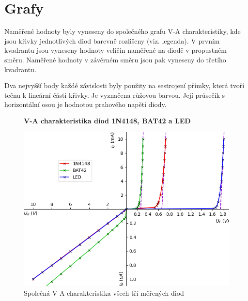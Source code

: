 \documentclass[a4paper, czech]{article}
\begin{document}
\begin{table}[H]
  \caption{Naměřené hodnoty V-A charakteristiky LED v \underline{závěrném} směru}
  \label{tab:6}
\end{table}

\section[short]{Grafy}

Naměřené hodnoty byly vyneseny do společného grafu V-A charakteristiky, kde jsou křivky jednotlivých diod barevně rozlišeny (viz. legenda).
V prvním kvadrantu jsou vyneseny hodnoty veličin naměřené na diodě v propustném směru.
Naměřené hodnoty v závěrném směru jsou pak vyneseny do třetího kvadrantu.

Dva nejvyšší body každé závislosti byly použity na sestrojení přímky, která tvoří tečnu k lineární části křivky.
Je vyznačena růžovou barvou. Její průsečík s horizontální osou je hodnotou prahového napětí diody.

\begin{figure}[H]
  \centering
  \textbf{V-A charakteristika diod 1N4148, BAT42 a LED}\par\medskip
  \includegraphics{va_charakteristika_final.png}
  \caption{Společná V-A charakteristika všech tří měřených diod}
  \label{obr:4}
\end{figure}
\end{document}
